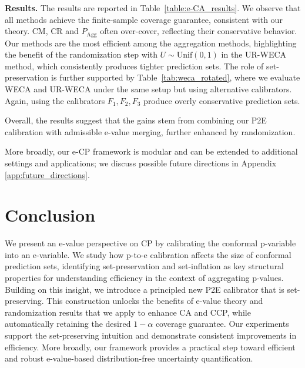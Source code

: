 \documentclass{article}
\theoremstyle{plain}
\theoremstyle{definition}
\theoremstyle{remark}
\begin{document}
\textbf{Results.} The results are reported in Table~\ref{table:e-CA_results}. We observe that all methods achieve the finite-sample coverage guarantee, consistent with our theory. CM, CR and $P_{\text{Agg}}$  often over-cover, reflecting their conservative behavior. Our methods are the most efficient among the aggregation methods, highlighting the benefit of the randomization step with $U\sim\mathrm{Unif}(0,1)$  in the UR-WECA method, which consistently produces tighter prediction sets. The role of set-preservation is further supported by Table~\ref{tab:weca_rotated}, where we evaluate WECA and UR-WECA under the same setup but using alternative calibrators. Again, using the calibrators $F_1,F_2,F_3$ produce overly conservative prediction sets. 


Overall, the results suggest that the gains stem from combining our P2E calibration with admissible e-value merging, further enhanced by randomization.


 More broadly, our e-CP framework is modular and can be extended to additional settings and applications; we discuss   possible future directions in Appendix \ref{app:future_directions}.

\section{Conclusion}

We present an e-value perspective on CP by calibrating the conformal p-variable into an e-variable. We study how p-to-e calibration affects the size of conformal prediction sets, identifying set-preservation and set-inflation as key structural properties for understanding efficiency in the context of aggregating p-values. Building on this insight, we introduce a principled new P2E calibrator that is set-preserving. This construction unlocks the benefits of e-value theory and randomization results that we apply to enhance CA and CCP, while automatically retaining the desired \(1-\alpha\) coverage guarantee. Our experiments support the set-preserving intuition and demonstrate consistent improvements in efficiency. More broadly, our framework provides a practical step toward efficient and robust e-value-based distribution-free uncertainty quantification.
\end{document}

